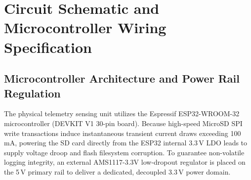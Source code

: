\chapter{Circuit Schematic and Microcontroller Wiring Specification}
\label{app:wiring}

\section{Microcontroller Architecture and Power Rail Regulation}
The physical telemetry sensing unit utilizes the Espressif ESP32-WROOM-32 microcontroller (DEVKIT V1 30-pin board). Because high-speed MicroSD SPI write transactions induce instantaneous transient current draws exceeding 100\,mA, powering the SD card directly from the ESP32 internal 3.3\,V LDO leads to supply voltage droop and flash filesystem corruption. To guarantee non-volatile logging integrity, an external AMS1117-3.3V low-dropout regulator is placed on the 5\,V primary rail to deliver a dedicated, decoupled 3.3\,V power domain.

